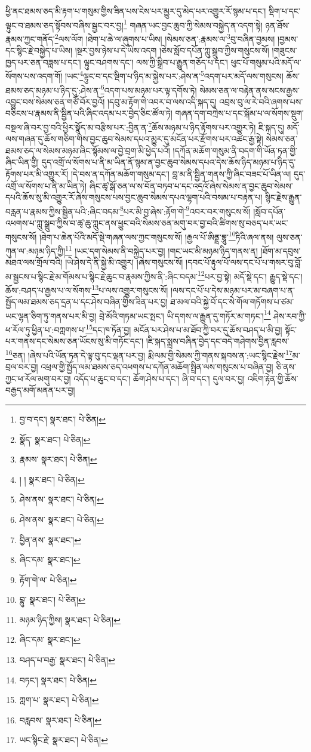 ཕྱི་ནང་ཐམས་ཅད་མི་རྟག་པ་གསུམ་གྱིས་ཟིན་པས་ངེས་པར་མྱུར་དུ་མེད་པར་འགྱུར་རོ་སྙམ་པ་དང་། སྡིག་པ་དང་ལྟུང་བ་ཐམས་ཅད་སྟོབས་བཞིས་སྦྱང་བར་བྱ།\footnote{བྱ་བ་དང་།  སྣར་ཐང་།  པེ་ཅིན། } གཞན་ཡང་བྱང་ཆུབ་ཀྱི་སེམས་བསྐྱེད་ན་འདག་སྟེ། ཉན་ཐོས་རྣམས་ཀྱང་གནོད་\footnote{སྣོད་  སྣར་ཐང་།  པེ་ཅིན། }ལས་ལོག །ཐེག་པ་ཆེ་ལ་ཞུགས་པ་ཡིས། །སེམས་ཅན་:རྣམས་ལ་\footnote{རྣམས་  སྣར་ཐང་།  པེ་ཅིན། }བུ་བཞིན་བྱམས། །བྱམས་དང་སྙིང་རྗེ་བསྐྱེད་པ་ཡིས། །སྔར་བྱས་ཉེས་པ་དེ་ཡིས་འདག །ཅེས་སློབ་དཔོན་ཀླུ་སྒྲུབ་ཀྱིས་གསུངས་སོ། །གཟུངས་ཁྱད་པར་ཅན་བཟླས་པ་དང་། ལྟུང་བཤགས་དང་། ལས་ཀྱི་སྒྲིབ་པ་རྒྱུན་གཅོད་པ་དང་། ཕུང་པོ་གསུམ་པའི་མདོ་ལ་སོགས་པས་འདག་གོ། །ཡང་\footnote{། །  སྣར་ཐང་།  པེ་ཅིན། }ལྟུང་བ་དང་སྡིག་པ་ཉིད་མ་སྐྱེས་པར་:ཤེས་ན་\footnote{ཤེས་ནས་  སྣར་ཐང་།  པེ་ཅིན། }འདག་པར་མདོ་ལས་གསུངས། ཆོས་ཐམས་ཅད་མཉམ་པ་ཉིད་དུ་:ཤེས་ན་\footnote{ཤེས་ནས་  སྣར་ཐང་།  པེ་ཅིན། }འདག་པས་མཉམ་པར་ལྟ་དགོས་ཏེ། སེམས་ཅན་ལ་བརྟེན་ནས་སངས་རྒྱས་འབྱུང་བས་སེམས་ཅན་གཙོ་བོར་བྱའོ། །དབུ་མ་རྟོག་གེ་འབར་བ་ལས་འདི་སྐད་དུ། འབྲས་བུ་ལ་རེ་བའི་ཞགས་པས་བཅིངས་པ་རྣམས་ནི་སྦྱིན་པའི་ཞིང་འདམ་པར་བྱེད་ཅིང་ཚོལ་ཏེ། གཞན་དག་བཀྲེས་པ་དང་སྐོམ་པ་ལ་སོགས་སྡུག་བསྔལ་ཞི་བར་བྱ་བའི་ཕྱིར་སྣོད་མ་བརྩིས་པར་:བྱིན་ན་\footnote{བྱིན་ནས་  སྣར་ཐང་། }ཆོས་མཉམ་པ་ཉིད་རྟོགས་པར་འགྱུར་ཏེ། ཇི་སྐད་དུ། མདོ་ལས་གཞན་དུ་ཆོས་གཅིག་གིས་བྱང་ཆུབ་སེམས་དཔའ་མྱུར་དུ་མངོན་པར་རྫོགས་པར་འཚང་རྒྱ་སྟེ། སེམས་ཅན་ཐམས་ཅད་ལ་སེམས་མཉམ་ཞིང་སྙོམས་ལ་བྱེ་བྲག་མི་ཕྱེད་པའོ། །དཀོན་མཆོག་གསུམ་ནི་བདག་གི་ཡོན་ཏན་གྱི་ཞིང་ཡིན་གྱི། དུད་འགྲོ་ལ་སོགས་པ་ནི་མ་ཡིན་ནོ་སྙམ་ན་བྱང་ཆུབ་སེམས་དཔའ་དེས་ཆོས་ཉིད་མཉམ་པ་ཉིད་དུ་རྟོགས་པར་མི་འགྱུར་རོ། །དེ་བས་ན་དཀོན་མཆོག་གསུམ་དང་། བླ་མ་ནི་སྦྱིན་གནས་ཀྱི་ཞིང་བཟང་པོ་ཡིན་ལ། དུད་འགྲོ་ལ་སོགས་པ་ནི་མ་ཡིན་ཏེ། ཞིང་ཚྭ་སྒོ་ཅན་ལ་ས་བོན་བཏབ་པ་དང་འདྲའོ་ཞེས་སེམས་ན་བྱང་ཆུབ་སེམས་དཔའི་ཆོས་སུ་མི་འགྱུར་རོ་ཞེས་གསུངས་པས་བྱང་ཆུབ་སེམས་དཔའ་ལྷག་པའི་བསམ་པ་བརྟན་པ། སྙིང་རྗེས་རྒྱུན་བརླན་པ་རྣམས་ཀྱིས་སྦྱིན་པའི་:ཞིང་བདམ་\footnote{ཞིང་དམ་  སྣར་ཐང་། }པར་མི་བྱ་ཞེས་:རྟོག་གེ་\footnote{རྟོག་གེ་ལ་  པེ་ཅིན། }འབར་བར་གསུངས་སོ། །སློབ་དཔོན་འཕགས་པ་ཀླུ་སྒྲུབ་ཀྱིས་བ་ཚྭ་ཆུ་ཀླུང་ནས་ཕྱུང་བའི་སེམས་ཅན་མགུ་བར་བྱ་བའི་ཚིགས་སུ་བཅད་པར་ཡང་གསུངས་སོ། །ཐེག་པ་ཆེན་པོའི་མདོ་སྡེ་གཞན་ལས་ཀྱང་གསུངས་སོ། །རྒྱལ་པོ་ཨིནྡྲ་བྷཱུ་\footnote{བྷུ་  སྣར་ཐང་།  པེ་ཅིན། }ཏིའི་ཞལ་ནས། ལུས་ཅན་ཀུན་ལ་:མཉམ་ཉིད་ཀྱི།\footnote{མཉམ་ཉིད་ཀྱིས།  སྣར་ཐང་།  པེ་ཅིན། } །ཡང་དག་སེམས་ནི་བསྐྱེད་པར་བྱ། །གང་ཡང་མི་མཉམ་ཉིད་གནས་ན། །ཐོག་མ་དབུས་མཐའ་ལས་གྲོལ་བའི། །ཡེ་ཤེས་དེ་ནི་སྐྱེ་མི་འགྱུར། །ཞེས་གསུངས་སོ། །དབང་པོ་རྟུལ་པོ་ལས་དང་པོ་པ་གསར་བུ་བློ་མ་སྦྱངས་པ་སྙིང་རྗེ་མ་གོམས་པ་སྙིང་རྗེ་ཆུང་བ་རྣམས་ཀྱིས་ནི་:ཞིང་བདམ་\footnote{ཞིང་དམ་  སྣར་ཐང་། }པར་བྱ་སྟེ། མདོ་སྡེ་དང་། རྒྱུད་སྡེ་དང་། ཆོས་:བཤད་པ་རྒྱས་པ་ལ་སོགས་\footnote{བཤད་པ་བརྒྱ་  སྣར་ཐང་།  པེ་ཅིན། }པ་ལས་འགྱུར་གསུངས་སོ། །ལས་དང་པོ་པ་དེས་མཉམ་པར་མ་བཞག་པ་ན་སྤྱོད་ལམ་ཐམས་ཅད་དྲན་པ་དང་ཤེས་བཞིན་གྱིས་ཟིན་པར་བྱ། ཐ་མལ་བའི་སྐྱེ་བོ་དང་སེ་གོལ་གཏོགས་པ་ཙམ་ཡང་ལྷན་ཅིག་ཏུ་གནས་པར་མི་བྱ། བྲེ་མོའི་གཏམ་ཡང་སྤང་། ཡི་དགས་ལ་རྒྱུན་དུ་གཏོར་མ་གཏང་།\footnote{བཏང་།  སྣར་ཐང་།  པེ་ཅིན། } ཤེས་རབ་ཀྱི་ཕ་རོལ་ཏུ་ཕྱིན་པ་:བཀླགས་པ་\footnote{ཀླག་པ་  སྣར་ཐང་།  པེ་ཅིན། }དང་ཁ་ཏོན་བྱ། མངོན་པར་ཤེས་པ་མ་ཐོབ་ཀྱི་བར་དུ་ཆོས་བཤད་པ་མི་བྱ། སྟོང་པར་གནས་དང་སེམས་ཅན་ཡོངས་སུ་མི་གཏོང་དང་། །ཇི་སྐད་སྨྲས་བཞིན་བྱེད་དང་བདེ་གཤེགས་བྱིན་རླབས་\footnote{བརླབས་  སྣར་ཐང་།  པེ་ཅིན། }ཅན། །ཞེས་པའི་ཡོན་ཏན་དེ་ལྟ་བུ་དང་ལྡན་པར་བྱ། རྨི་ལམ་གྱི་སེམས་ཀྱི་གནས་སྐབས་ན་:ཡང་སྙིང་རྗེས་\footnote{ཡང་སྙིང་རྗེ་  སྣར་ཐང་།  པེ་ཅིན། }མ་བྲལ་བར་བྱ། འཕྲལ་གྱི་སྤྱོད་ལམ་ཐམས་ཅད་འཕགས་པ་དཀོན་མཆོག་སྤྲིན་ལས་གསུངས་པ་བཞིན་བྱ། ཅི་ནས་ཀྱང་ཕ་རོལ་མགུ་བར་བྱ། འདོད་པ་ཆུང་བ་དང་། ཆོག་ཤེས་པ་དང་། ཞི་བ་དང་། དུལ་བར་བྱ། འཇིག་རྟེན་གྱི་ཆོས་བརྒྱད་མགོ་མནན་པར་བྱ། 